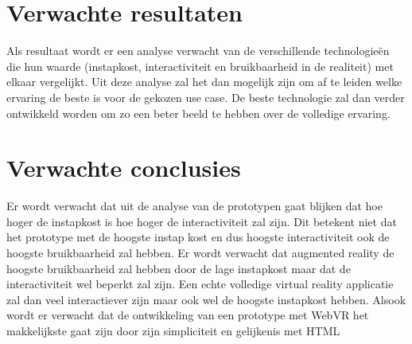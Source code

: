 \section{Verwachte resultaten}
\label{sec:verwachte_resultaten}

Als resultaat wordt er een analyse verwacht van de verschillende technologieën die hun waarde (instapkost, interactiviteit en bruikbaarheid in de realiteit) met elkaar vergelijkt. Uit deze analyse zal het dan mogelijk zijn om af te leiden welke ervaring de beste is voor de gekozen use case. De beste technologie zal dan verder ontwikkeld worden om zo een beter beeld te hebben over de volledige ervaring.

\section{Verwachte conclusies}
\label{sec:verwachte_conclusies}

Er wordt verwacht dat uit de analyse van de prototypen gaat blijken dat hoe hoger de instapkost is hoe hoger de interactiviteit zal zijn. Dit betekent niet dat het prototype met de hoogste instap kost en dus hoogste interactiviteit ook de hoogste bruikbaarheid zal hebben. Er wordt verwacht dat augmented reality de hoogste bruikbaarheid zal hebben door de lage instapkost maar dat de interactiviteit wel beperkt zal zijn. Een echte volledige virtual reality applicatie zal dan veel interactiever zijn maar ook wel de hoogste instapkost hebben. Alsook wordt er verwacht dat de ontwikkeling van een prototype met WebVR het makkelijkste gaat zijn door zijn simpliciteit en gelijkenis met HTML

